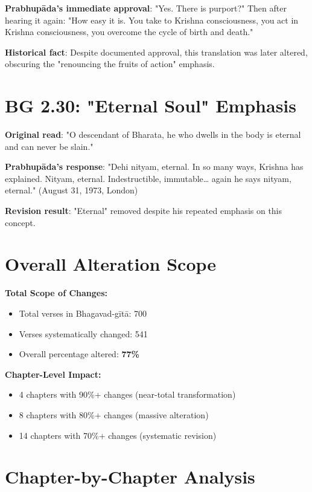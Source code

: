 \documentclass[11pt,twoside]{book}
\begin{document}
\textbf{\textbf{Prabhupāda's immediate approval}}: "Yes. There is purport?" Then after hearing it again: "How easy it is. You take to Krishna consciousness, you act in Krishna consciousness, you overcome the cycle of birth and death."

\textbf{\textbf{Historical fact}}: Despite documented approval, this translation was later altered, obscuring the "renouncing the fruits of action" emphasis.
\section*{BG 2.30: "Eternal Soul" Emphasis}
\label{sec:orga1f53e5}
\textbf{\textbf{Original read}}: "O descendant of Bharata, he who dwells in the body is eternal and can never be slain."

\textbf{\textbf{Prabhupāda's response}}: "Dehi nityam, eternal. In so many ways, Krishna has explained. Nityam, eternal. Indestructible, immutable\ldots{} again he says nityam, eternal." (August 31, 1973, London)

\textbf{\textbf{Revision result}}: "Eternal" removed despite his repeated emphasis on this concept.
\section*{Overall Alteration Scope}
\label{sec:org412ebc2}

\textbf{\textbf{Total Scope of Changes:}}
\begin{itemize}
\item Total verses in Bhagavad-gītā: 700
\item Verses systematically changed: 541
\item Overall percentage altered: \textbf{\textbf{77\%}}
\end{itemize}

\textbf{\textbf{Chapter-Level Impact:}}
\begin{itemize}
\item 4 chapters with 90\%+ changes (near-total transformation)
\item 8 chapters with 80\%+ changes (massive alteration)
\item 14 chapters with 70\%+ changes (systematic revision)
\end{itemize}
\section*{Chapter-by-Chapter Analysis}
\label{sec:org29bf080}
\end{document}
